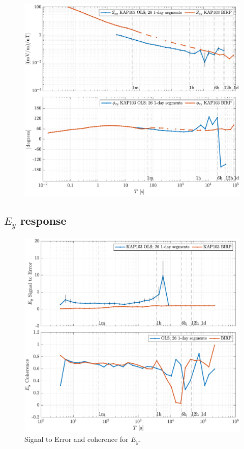 \documentclass{article}
\begin{document}
\clearpage

\begin{figure}[h!]
\centering
\includegraphics[width=\textwidth]{figures/KAP103/transferfnZ_compare-Z_xy_Magnitude_Phase.pdf}
\caption{}
\label{fig:universe}
\end{figure}

\clearpage

\subsection{$E_y$ response}

\begin{figure}[h!]
\centering
\includegraphics[width=\textwidth]{figures/KAP103/SN_compare-E_y.pdf}
\caption{Signal to Error and coherence for $E_y$.}
\label{fig:universe}
\end{figure}
\end{document}

